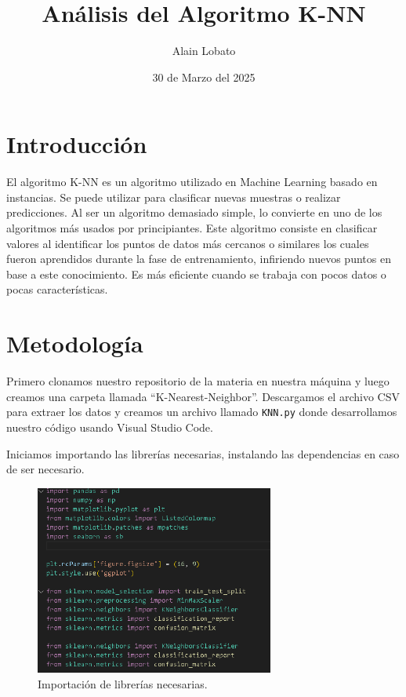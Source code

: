 \documentclass{article}
\title{Análisis del Algoritmo K-NN}
\author{Alain Lobato}
\date{30 de Marzo del 2025}
\begin{document}
\maketitle

\section{Introducción}
El algoritmo K-NN es un algoritmo utilizado en Machine Learning basado en instancias. Se puede utilizar para clasificar nuevas muestras o realizar predicciones. Al ser un algoritmo demasiado simple, lo convierte en uno de los algoritmos más usados por principiantes. Este algoritmo consiste en clasificar valores al identificar los puntos de datos más cercanos o similares los cuales fueron aprendidos durante la fase de entrenamiento, infiriendo nuevos puntos en base a este conocimiento. Es más eficiente cuando se trabaja con pocos datos o pocas características.

\section{Metodología}
Primero clonamos nuestro repositorio de la materia en nuestra máquina y luego creamos una carpeta llamada ``K-Nearest-Neighbor''. Descargamos el archivo CSV para extraer los datos y creamos un archivo llamado \texttt{KNN.py} donde desarrollamos nuestro código usando Visual Studio Code.

Iniciamos importando las librerías necesarias, instalando las dependencias en caso de ser necesario.

\begin{figure}[H]
    \centering
    \includegraphics[width=0.7\textwidth]{img/1.png}
    \caption{Importación de librerías necesarias.}
\end{figure}
\end{document}
